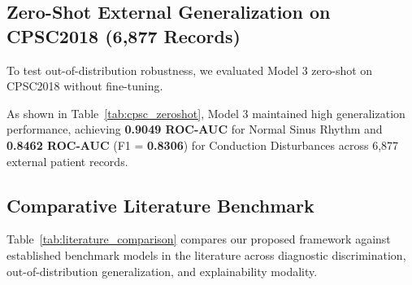 \documentclass[5p,twocolumn,10pt]{elsarticle}
\begin{document}
\subsection{Zero-Shot External Generalization on CPSC2018 (6,877 Records)}
To test out-of-distribution robustness, we evaluated Model 3 zero-shot on CPSC2018 without fine-tuning.

\begin{table}[t]
\caption{Zero-Shot Benchmark Results on CPSC2018 Dataset (6,877 Records).}
\label{tab:cpsc_zeroshot}
\centering
\small
\setlength{\tabcolsep}{3.5pt}
\end{table}

As shown in Table~\ref{tab:cpsc_zeroshot}, Model 3 maintained high generalization performance, achieving \textbf{0.9049 ROC-AUC} for Normal Sinus Rhythm and \textbf{0.8462 ROC-AUC} (F1 = \textbf{0.8306}) for Conduction Disturbances across 6,877 external patient records.

\subsection{Comparative Literature Benchmark}
Table~\ref{tab:literature_comparison} compares our proposed framework against established benchmark models in the literature across diagnostic discrimination, out-of-distribution generalization, and explainability modality.
\end{document}
